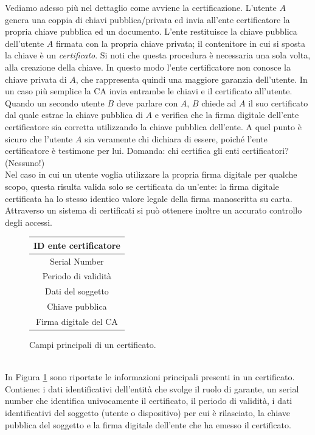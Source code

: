 Vediamo adesso più nel dettaglio come avviene la certificazione. L'utente $A$ genera una coppia di chiavi pubblica/privata ed invia all'ente certificatore la propria chiave pubblica ed un documento. L'ente restituisce la chiave pubblica dell'utente $A$ firmata con la propria chiave privata; il contenitore in cui si sposta la chiave è un \textit{certificato}. Si noti che questa procedura è necessaria una sola volta, alla creazione della chiave. In questo modo l'ente certificatore non conosce la chiave privata di $A$, che rappresenta quindi una maggiore garanzia dell'utente. In un caso più semplice la CA invia entrambe le chiavi e il certificato all'utente.\\
Quando un secondo utente $B$ deve parlare con $A$, $B$ chiede ad $A$ il suo certificato dal quale estrae la chiave pubblica di $A$ e verifica che la firma digitale dell'ente certificatore sia corretta utilizzando la chiave pubblica dell'ente. A quel punto è sicuro che l'utente $A$ sia veramente chi dichiara di essere, poiché l'ente certificatore è testimone per lui. Domanda: chi certifica gli enti certificatori? (Nessuno!)\\
Nel caso in cui un utente voglia utilizzare la propria firma digitale per qualche scopo, questa risulta valida solo se certificata da un'ente: la firma digitale certificata ha lo stesso identico valore legale della firma manoscritta su carta. Attraverso un sistema di certificati si può ottenere inoltre un accurato controllo degli accessi.
\begin{figure}[htbp]
	\centering
	\begin{tabular}{|c|}
		\hline
		ID ente certificatore \\
		\hline
		Serial Number \\
		\hline
		Periodo di validità \\
		\hline
		Dati del soggetto \\
		\hline
		Chiave pubblica \\
		\hline
		Firma digitale del CA \\ \hline
	\end{tabular}
	\caption{Campi principali di un certificato.}
	\label{tab:certificate}
\end{figure}\\
In Figura \ref{tab:certificate} sono riportate le informazioni principali presenti in un certificato. Contiene: i dati identificativi dell'entità che svolge il ruolo di garante, un serial number che identifica univocamente il certificato, il periodo di validità, i dati identificativi del soggetto (utente o dispositivo) per cui è rilasciato, la chiave pubblica del soggetto e la firma digitale dell'ente che ha emesso il certificato.

